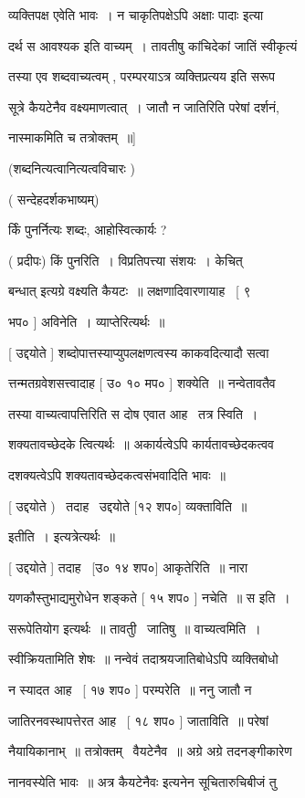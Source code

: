 \documentclass[11pt, openany]{book}
\begin{document}
व्यक्तिपक्ष एवेति भावः~। न चाकृतिपक्षेऽपि {\qt अक्षाः पादाः} इत्या \textendash\ 

दर्थ स आवश्यक इति वाच्यम्~। तावतीषु कांचिदेकां जातिं स्वीकृत्यं 

तस्या एव शब्दवाच्यत्वम् , परम्परयाऽत्र व्यक्तिप्रत्यय इति सरूप \textendash\ 

सूत्रे कैयटेनैव वक्ष्यमाणत्वात्~। जातौ न जातिरिति परेषां दर्शनं, 

नास्माकमिति च तत्रोक्तम्~॥] 

(शब्दनित्यत्वानित्यत्वविचारः ) 

( सन्देहदर्शकभाष्यम्) 

र्किं पुनर्नित्यः शब्दः, आहोस्वित्कार्यः ? 

( प्रदीपः) किं पुनरिति~। विप्रतिपत्त्या संशयः~। केचित् 



{\qt बन्धात्} इत्यग्रे वक्ष्यति कैयटः~॥ लक्षणादिवारणायाह \textendash\ [ ९ 

भप० ] अविनेति~। व्याप्तेरित्यर्थः~॥ 

[ उद्दयोते ] शब्दोपात्तस्याप्युपलक्षणत्वस्य काकवदित्यादौ सत्वा \textendash\ 

त्तन्मतग्रवेशसत्त्वादाह [ उ० १० मप० ] शक्येति~॥ नन्वेतावतैव 

तस्या वाच्यत्वापत्तिरिति स दोष एवात आह \textendash\ तत्र स्विति~। 

शक्यतावच्छेदके त्वित्यर्थः~॥ अकार्यत्वेऽपि कार्यतावच्छेदकत्वव \textendash\ 

दशक्यत्वेऽपि शक्यतावच्छेदकत्वसंभवादिति भावः~॥ 

[ उद्दयोते ) \textendash\ तदाह \textendash\ उद्दयोते [१२ शप०] व्यक्ताविति~॥ 

इतीति~। इत्यत्रेत्यर्थः~॥ 

[ उद्दयोते ] तदाह \textendash\ [उ० १४ शप०] आकृतेरिति~॥ नारा \textendash\ 

यणकौस्तुभाद्यमुरोधेन शङ्कते [ १५ शप० ] नचेति~॥ स इति~। 

सरूपेतियोग इत्यर्थः~॥ तावतीु \textendash\ जातिषु~॥ वाच्यत्वमिति~। 

{\qt स्वीक्रियतामिति शेषः~॥} नन्वेवं तदाश्रयजातिबोधेऽपि व्यक्तिबोधो 

न स्यादत आह \textendash\ [ १७ शप० ] परम्परेति~॥ ननु जातौ न 

जातिरनवस्थापत्तेरत आह \textendash\ [ १८ शप० ] जाताविति~॥ परेषां 

नैयायिकानाभ्~॥ तत्रोक्तम् \textendash\ वैयटेनैव~॥ अग्रे अग्रे तदनङ्गीकारेण 

नानवस्येति भावः~॥ अत्र {\qt कैयटेनैवः इत्यनेन} सूचितारुचिबीजं तु 
\end{document}
